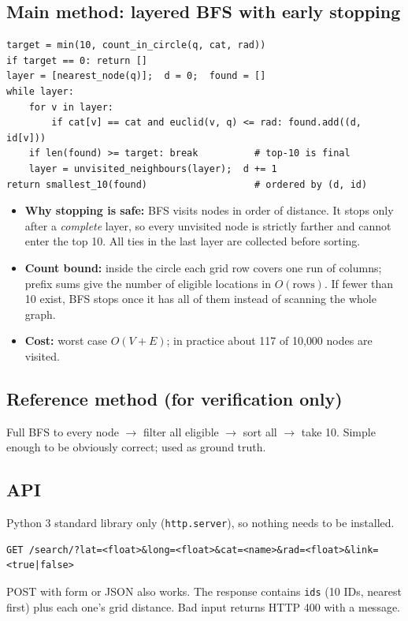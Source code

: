 \documentclass[11pt,a4paper]{article}
\newcommand{\code}[1]{\texttt{#1}}
\begin{document}
\subsection{Main method: layered BFS with early stopping}
\begin{lstlisting}
target = min(10, count_in_circle(q, cat, rad))
if target == 0: return []
layer = [nearest_node(q)];  d = 0;  found = []
while layer:
    for v in layer:
        if cat[v] == cat and euclid(v, q) <= rad: found.add((d, id[v]))
    if len(found) >= target: break          # top-10 is final
    layer = unvisited_neighbours(layer);  d += 1
return smallest_10(found)                   # ordered by (d, id)
\end{lstlisting}
\begin{itemize}
  \item \textbf{Why stopping is safe:} BFS visits nodes in order of distance. It stops only after a
        \emph{complete} layer, so every unvisited node is strictly farther and cannot enter the top 10.
        All ties in the last layer are collected before sorting.
  \item \textbf{Count bound:} inside the circle each grid row covers one run of columns; prefix sums give the
        number of eligible locations in $O(\text{rows})$. If fewer than 10 exist, BFS stops once it has all of them
        instead of scanning the whole graph.
  \item \textbf{Cost:} worst case $O(V+E)$; in practice about 117 of 10{,}000 nodes are visited.
\end{itemize}

\subsection{Reference method (for verification only)}
Full BFS to every node $\rightarrow$ filter all eligible $\rightarrow$ sort all $\rightarrow$ take 10.
Simple enough to be obviously correct; used as ground truth.

\subsection{API}
Python 3 standard library only (\code{http.server}), so nothing needs to be installed.
\begin{lstlisting}[language={}, numbers=none, basicstyle=\ttfamily\footnotesize]
GET /search/?lat=<float>&long=<float>&cat=<name>&rad=<float>&link=<true|false>
\end{lstlisting}
POST with form or JSON also works. The response contains \code{ids} (10 IDs, nearest first) plus each one's grid distance.
Bad input returns HTTP 400 with a message.
\end{document}
